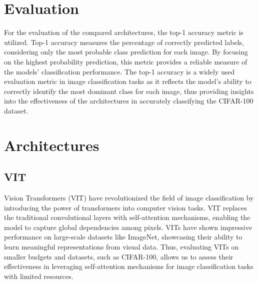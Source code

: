 \documentclass{article}
\begin{document}

\section{Evaluation}
For the evaluation of the compared architectures, the top-1 accuracy metric is utilized.
Top-1 accuracy measures the percentage of correctly predicted labels, considering only the most probable class prediction for each image. By focusing on the highest probability prediction, this metric provides a reliable measure of the models' classification performance.
The top-1 accuracy is a widely used evaluation metric in image classification tasks as it reflects the model's ability to correctly identify the most dominant class for each image, thus providing insights into the effectiveness of the architectures in accurately classifying the CIFAR-100 dataset.

\section{Architectures}


\subsection{VIT}
Vision Transformers (VIT) have revolutionized the field of image classification by introducing the power of transformers into computer vision tasks. 
VIT replaces the traditional convolutional layers with self-attention mechanisms, enabling the model to capture global dependencies among pixels. VITs have shown impressive performance on large-scale datasets like ImageNet, showcasing their ability to learn meaningful representations from visual data. Thus, evaluating VITs on smaller budgets and datasets, such as CIFAR-100, allows us to assess their effectiveness in leveraging self-attention mechanisms for image classification tasks with limited resources.
\end{document}
